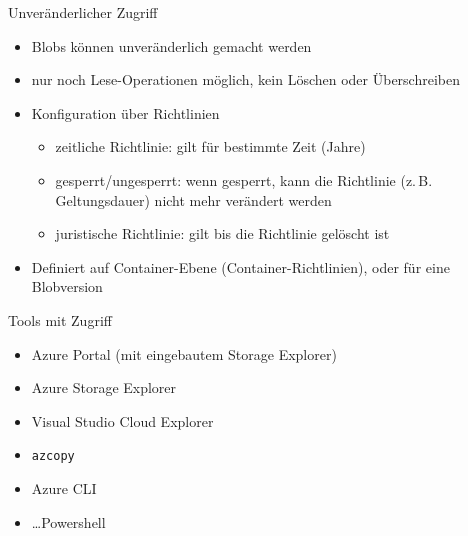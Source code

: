 \begin{flashcard}[Definition]{Unveränderlicher Zugriff}
  \begin{itemize}
    \item Blobs können unveränderlich gemacht werden
    \item nur noch Lese-Operationen möglich, kein Löschen oder Überschreiben
    \item Konfiguration über Richtlinien
      \begin{itemize}
        \item zeitliche Richtlinie: gilt für bestimmte Zeit (Jahre)
        \item gesperrt/ungesperrt: wenn gesperrt, kann die Richtlinie\newline
          (z.\,B. Geltungsdauer) nicht mehr verändert werden
        \item juristische Richtlinie: gilt bis die Richtlinie gelöscht ist
      \end{itemize}
    \item Definiert auf Container-Ebene (Container-Richtlinien), oder für eine Blobversion
  \end{itemize}
\end{flashcard}



\begin{flashcard}[Definition]{Tools mit Zugriff}
  \begin{itemize}
    \item Azure Portal (mit eingebautem Storage Explorer)
    \item Azure Storage Explorer
    \item Visual Studio Cloud Explorer
    \item \texttt{azcopy}
    \item Azure CLI
    \item \ldots Powershell
  \end{itemize}
\end{flashcard}
